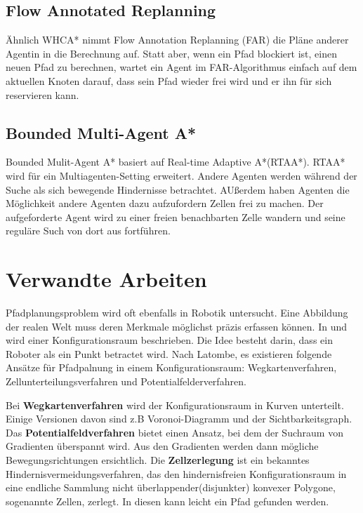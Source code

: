 \subsection{Flow Annotated Replanning}
Ähnlich WHCA* nimmt Flow Annotation Replanning (FAR) die Pläne anderer Agentin in die Berechnung auf. Statt aber, wenn ein Pfad blockiert ist, einen neuen Pfad zu berechnen, wartet ein Agent im FAR-Algorithmus einfach auf dem aktuellen Knoten darauf, dass sein Pfad wieder frei wird und er ihn für sich reservieren kann. 

\subsection{Bounded Multi-Agent A*}
Bounded Mulit-Agent A* basiert auf Real-time Adaptive A*(RTAA*). RTAA* wird für ein Multiagenten-Setting erweitert. Andere Agenten werden während der Suche als sich bewegende Hindernisse betrachtet. AUßerdem haben Agenten die Möglichkeit andere Agenten dazu aufzufordern Zellen frei zu machen. Der aufgeforderte Agent wird zu einer freien benachbarten Zelle wandern und seine reguläre Such von dort aus fortführen\cite{Sigurdson.2019}.


\section{Verwandte Arbeiten} 
Pfadplanungsproblem wird oft ebenfalls in Robotik untersucht. Eine Abbildung der realen Welt muss deren Merkmale möglichst präzis erfassen können. In \cite{lozano} und \cite{latombe} wird einer Konfigurationsraum beschrieben. Die Idee besteht darin, dass ein Roboter als ein Punkt betractet wird. Nach Latombe\cite{latombe}, es existieren folgende Ansätze für Pfadpalnung in einem Konfigurationsraum: Wegkartenverfahren, Zellunterteilungsverfahren und Potentialfelderverfahren. 

Bei \textbf{Wegkartenverfahren} wird der Konfigurationsraum in Kurven unterteilt. Einige Versionen davon sind z.B Voronoi-Diagramm\cite{voronoi} und der Sichtbarkeitsgraph\cite{visG1}. Das \textbf{Potentialfeldverfahren} bietet einen Ansatz, bei dem der Suchraum von Gradienten überspannt wird. Aus den Gradienten werden dann mögliche Bewegungsrichtungen ersichtlich. Die \textbf{Zellzerlegung}\cite{cd} ist ein bekanntes Hindernisvermeidungsverfahren, das den hindernisfreien Konfigurationsraum in eine endliche Sammlung nicht überlappender(disjunkter) konvexer Polygone, sogenannte Zellen, zerlegt. In diesen kann leicht ein Pfad gefunden werden.